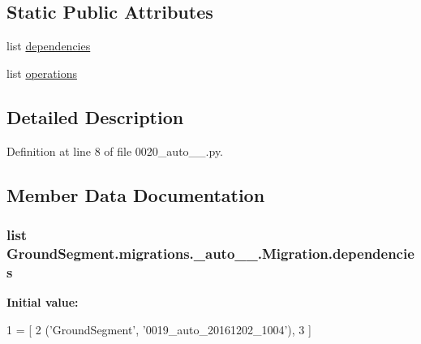 \subsection*{Static Public Attributes}
\begin{DoxyCompactItemize}
\item 
list \hyperlink{class_ground_segment_1_1migrations_1_10020__auto__20161202__1040_1_1_migration_a64b2c65a34df479d7993b602faf4509e}{dependencies}
\item 
list \hyperlink{class_ground_segment_1_1migrations_1_10020__auto__20161202__1040_1_1_migration_aaff1b2e3abd1729957533fd1b092344a}{operations}
\end{DoxyCompactItemize}


\subsection{Detailed Description}


Definition at line 8 of file 0020\+\_\+auto\+\_\+\_.\+py.



\subsection{Member Data Documentation}
\hypertarget{class_ground_segment_1_1migrations_1_10020__auto__20161202__1040_1_1_migration_a64b2c65a34df479d7993b602faf4509e}{}
\subsubsection[{dependencies}]{\setlength{\rightskip}{0pt plus 5cm}list Ground\+Segment.\+migrations.\+\_\+auto\+\_\+\_.\+Migration.\+dependencies\hspace{0.3cm}{\ttfamily [static]}}\label{class_ground_segment_1_1migrations_1_10020__auto__20161202__1040_1_1_migration_a64b2c65a34df479d7993b602faf4509e}
{\bfseries Initial value\+:}
\begin{DoxyCode}
1 = [
2         (\textcolor{stringliteral}{'GroundSegment'}, \textcolor{stringliteral}{'0019\_auto\_20161202\_1004'}),
3     ]
\end{DoxyCode}


